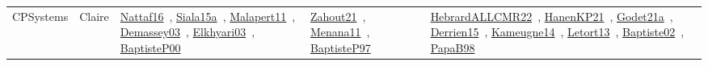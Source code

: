 {\begin{longtable}{lp{3cm}>{\raggedright\arraybackslash}p{6cm}>{\raggedright\arraybackslash}p{6cm}>{\raggedright\arraybackslash}p{8cm}}
CPSystems & Claire & \href{works/Nattaf16.pdf}{Nattaf16}~\cite{Nattaf16}, \href{works/Siala15a.pdf}{Siala15a}~\cite{Siala15a}, \href{works/Malapert11.pdf}{Malapert11}~\cite{Malapert11}, \href{works/Demassey03.pdf}{Demassey03}~\cite{Demassey03}, \href{works/Elkhyari03.pdf}{Elkhyari03}~\cite{Elkhyari03}, \href{works/BaptisteP00.pdf}{BaptisteP00}~\cite{BaptisteP00} & \href{works/Zahout21.pdf}{Zahout21}~\cite{Zahout21}, \href{works/Menana11.pdf}{Menana11}~\cite{Menana11}, \href{works/BaptisteP97.pdf}{BaptisteP97}~\cite{BaptisteP97} & \href{works/HebrardALLCMR22.pdf}{HebrardALLCMR22}~\cite{HebrardALLCMR22}, \href{works/HanenKP21.pdf}{HanenKP21}~\cite{HanenKP21}, \href{works/Godet21a.pdf}{Godet21a}~\cite{Godet21a}, \href{works/Derrien15.pdf}{Derrien15}~\cite{Derrien15}, \href{works/Kameugne14.pdf}{Kameugne14}~\cite{Kameugne14}, \href{works/Letort13.pdf}{Letort13}~\cite{Letort13}, \href{works/Baptiste02.pdf}{Baptiste02}~\cite{Baptiste02}, \href{works/PapaB98.pdf}{PapaB98}~\cite{PapaB98}\\

\end{longtable}}
